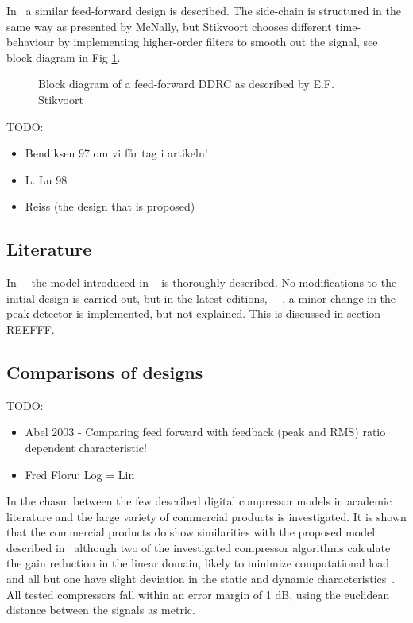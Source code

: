\documentclass[../main2.tex]{subfiles}
\begin{document}
In~\cite{stikvoort1986digital} a similar feed-forward design is described. The side-chain is structured in the same way as presented by McNally, but Stikvoort chooses different time-behaviour by implementing higher-order filters to smooth out the signal, see block diagram in Fig \ref{fig:block_stikvoort}.
\begin{figure}
\caption{Block diagram of a feed-forward DDRC as described by E.F. Stikvoort}
\label{fig:block_stikvoort}
\end{figure}
TODO:
\begin{itemize}
\item Bendiksen 97 om vi får tag i artikeln!
\item L. Lu 98
\item Reiss (the design that is proposed)
\end{itemize}
\subsection*{Literature}
In~\cite{zoe1997digital}~\cite{dafx02} the model introduced in ~\cite{mcnally1984dynamic} is thoroughly described. No modifications to the initial design is carried out, but in the latest editions,~\cite{zoelzer2005digital} ~\cite{dafx11}, a minor change in the peak detector is implemented, but not explained. This is discussed in section REEFFF.
\subsection{Comparisons of designs}
TODO:
\begin{itemize}
\item Abel 2003 - Comparing feed forward with feedback (peak and RMS) ratio dependent characteristic!
\item Fred Floru: Log = Lin
\end{itemize}
In \cite{bitzer2006parameter} the chasm between the few described digital compressor models in academic literature and the large variety of commercial products is investigated. It is shown that the commercial products do show similarities with the proposed model described in~\cite{mcnally1984dynamic}\cite{zolzer1997digital}\cite{dafx} although two of the investigated compressor algorithms calculate the gain reduction in the linear domain, likely to minimize computational load and all but one have slight deviation in the static and dynamic characteristics~\cite{bitzer2006parameter}. All tested compressors fall within an error margin of 1 dB, using the euclidean distance between the signals as metric.
\end{document}
